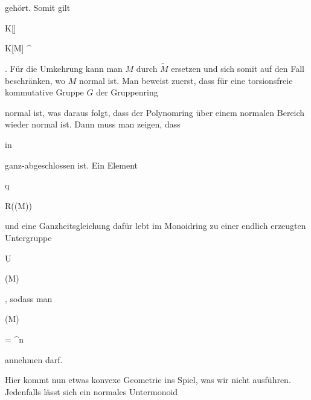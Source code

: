 { gehört. Somit gilt


\mavergleichskette

{\vergleichskette

{ K[]
}

{ \subseteq }{ K[M] ^{ }
}

{  }{
}

{    }{
}

{   }{
}

}
{}{}{.}
Für die Umkehrung kann man $M$ durch $\tilde{M}$ ersetzen und sich somit auf den Fall beschränken, wo $M$ normal ist. Man beweist zuerst, dass für eine torsionsfreie kommutative Gruppe $G$ der Gruppenring

 normal ist, was daraus folgt, dass der Polynomring über einem normalen Bereich wieder normal ist. Dann muss man zeigen, dass

 in

 ganz-abgeschlossen ist. Ein Element


\mavergleichskette

{\vergleichskette

{ q
}

{ \in }{ R(\Gamma(M))
}

{  }{
}

{    }{
}

{   }{
}

}
{}{}{}
und eine Ganzheitsgleichung dafür lebt im Monoidring zu einer endlich erzeugten Untergruppe


\mavergleichskette

{\vergleichskette

{U
}

{ \subseteq }{ \Gamma(M)
}

{  }{
}

{    }{
}

{   }{
}

}
{}{}{,}
sodass man


\mavergleichskette

{\vergleichskette

{ \Gamma(M)
}

{ = }{ \Z^n
}

{  }{
}

{    }{
}

{   }{
}

}
{}{}{}
annehmen darf.


Hier kommt nun etwas konvexe Geometrie ins Spiel, was wir nicht ausführen. Jedenfalls lässt sich ein normales Untermonoid


}
